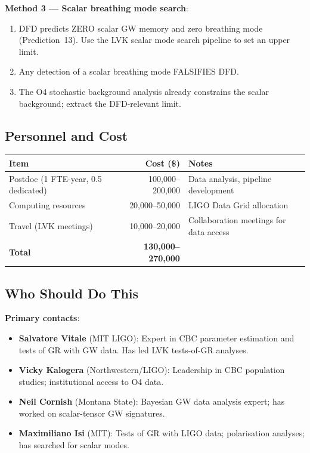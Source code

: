 \documentclass[11pt]{article}
\begin{document}
\textbf{Method 3 --- Scalar breathing mode search}:
\begin{enumerate}[nosep]
\item DFD predicts ZERO scalar GW memory and zero breathing
  mode (Prediction~13). Use the LVK scalar mode search pipeline
  to set an upper limit.
\item Any detection of a scalar breathing mode FALSIFIES DFD.
\item The O4 stochastic background analysis already constrains
  the scalar background; extract the DFD-relevant limit.
\end{enumerate}

\subsection{Personnel and Cost}

\begin{center}
\renewcommand{\arraystretch}{1.2}
\begin{tabular}{@{}lrl@{}}
\toprule
\textbf{Item} & \textbf{Cost (\$)} & \textbf{Notes} \\
\midrule
Postdoc (1 FTE-year, 0.5 dedicated) & 100,000--200,000 &
  Data analysis, pipeline development \\
Computing resources & 20,000--50,000 &
  LIGO Data Grid allocation \\
Travel (LVK meetings) & 10,000--20,000 &
  Collaboration meetings for data access \\
\midrule
\textbf{Total} & \textbf{130,000--270,000} & \\
\bottomrule
\end{tabular}
\end{center}

\subsection{Who Should Do This}

\textbf{Primary contacts}:
\begin{itemize}[nosep]
\item \textbf{Salvatore Vitale} (MIT LIGO): Expert in CBC parameter
  estimation and tests of GR with GW data. Has led LVK tests-of-GR
  analyses.
\item \textbf{Vicky Kalogera} (Northwestern/LIGO): Leadership in
  CBC population studies; institutional access to O4 data.
\item \textbf{Neil Cornish} (Montana State): Bayesian GW data analysis
  expert; has worked on scalar-tensor GW signatures.
\item \textbf{Maximiliano Isi} (MIT): Tests of GR with LIGO data;
  polarisation analyses; has searched for scalar modes.
\end{itemize}
\end{document}
